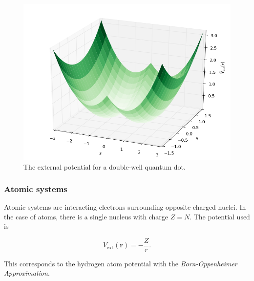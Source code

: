 \begin{frame}
 \begin{figure}
 \begin{center}
  \includegraphics[scale=0.4]{../graphics/Potentials/doubleWell.png}
  \caption{The external potential for a double-well quantum dot.}
  \label{fig:extPotDoubleWell}
 \end{center}
\end{figure}
\end{frame}

\begin{frame}
 \frametitle{Atomic systems}
 
 Atomic systems are interacting electrons surrounding opposite charged nuclei. In the case of atoms, there is a single nucleus with charge $Z=N$. The potential used is
 
 \begin{equation}
 V_\mathrm{ext}(\mathbf{r}) = -\frac{Z}{r}. \label{eq:v0hydro}
\end{equation}
 \shift
 
 This corresponds to the hydrogen atom potential with the \textit{Born-Oppenheimer Approximation}.
 
\end{frame}

